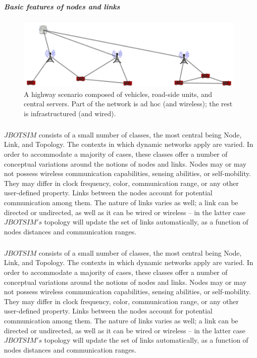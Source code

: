 \subparagraph{Basic features of nodes and links} 
\begin{figure}[h!]
	\centering
	\includegraphics[width=0.7\linewidth]{fig_2}
	\caption[A highway scenario composed of vehicles, road-side units, and central servers. Part of the network is ad hoc (and wireless); the rest is infrastructured (and wired).]{A highway scenario composed of vehicles, road-side units, and central servers. Part of the network is ad hoc (and wireless); the rest is infrastructured (and wired).}
	\label{fig:fig2}
\end{figure}
\subparagraph{} $JBOTSIM$ consists of a small number of classes, the most central being Node, Link, and Topology. The contexts in which dynamic networks apply are varied. In order to accommodate a majority of cases, these classes offer a number of conceptual variations around the notions of nodes and links. Nodes may or may not possess wireless communication capabilities, sensing abilities, or self-mobility. They may differ in clock frequency, color, communication range, or any other user-defined property. Links between the nodes account for potential communication among them. The nature of links varies as well; a link can be directed or undirected, as well as it can be wired or wireless – in the latter case  $JBOTSIM's$ topology will update the set of links automatically, as a function of nodes distances and communication ranges.
\subparagraph{} $JBOTSIM$  consists of a small number of classes, the most central being Node, Link, and Topology. The contexts in which dynamic networks apply are varied. In order to accommodate a majority of cases, these classes offer a number of conceptual variations around the notions of nodes and links. Nodes may or may not possess wireless communication capabilities, sensing abilities, or self-mobility. They may differ in clock frequency, color, communication range, or any other user-defined property. Links between the nodes account for potential communication among them.
\newpage
The nature of links varies as well; a link can be directed or undirected, as well as it can be wired or wireless – in the latter case $JBOTSIM's$ topology will update the set of links automatically, as a function of nodes distances and communication ranges.

